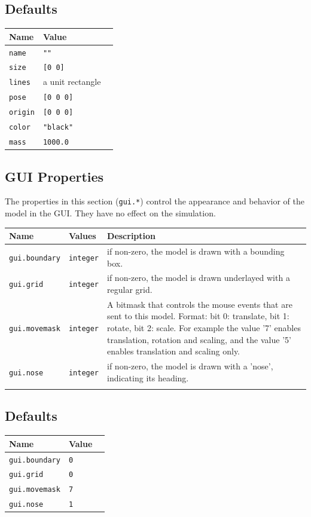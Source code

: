\documentclass[letter,11pt,twoside]{report}
\begin{document}
\subsection*{Defaults}
\begin{tabularx}{\columnwidth}{llX}
\hline
Name & Value\\
\hline
\verb'name' & \verb'""'\\
\verb'size' & \verb'[0 0]'\\
\verb'lines' & a unit rectangle\\
\verb'pose' & \verb'[0 0 0]'\\
\verb'origin' & \verb'[0 0 0]'\\
\verb'color' & \verb'"black"'\\
\verb'mass' & \verb'1000.0'\\
\hline
\end{tabularx}

\subsection*{GUI Properties}

The properties in this section (\verb'gui.*') control the appearance
and behavior of the model in the GUI. They have no effect on the
simulation.

\begin{tabularx}{\columnwidth}{llX}
\hline
Name & Values & Description \\
\hline

\verb'gui.boundary'& \verb'integer' & if non-zero, the model is drawn with a
bounding box.\\

\verb'gui.grid'& \verb'integer' & if non-zero, the model is drawn
underlayed with a regular grid.\\

\verb'gui.movemask'& \verb'integer' & A bitmask that controls the
mouse events that are sent to this model. Format: bit 0: translate,
bit 1: rotate, bit 2: scale. For example the value '7' enables
translation, rotation and scaling, and the value '5' enables
translation and scaling only.\\

\verb'gui.nose'& \verb'integer' & if non-zero, the model is drawn with a
'nose', indicating its heading.\\
\\
\hline
\end{tabularx}

\subsection*{Defaults}
\begin{tabularx}{\columnwidth}{llX}
\hline
Name & Value\\
\hline
\verb'gui.boundary' & \verb'0'\\
\verb'gui.grid' & \verb'0'\\
\verb'gui.movemask' & \verb'7'\\
\verb'gui.nose' & \verb'1'\\
\hline
\end{tabularx}
\end{document}
